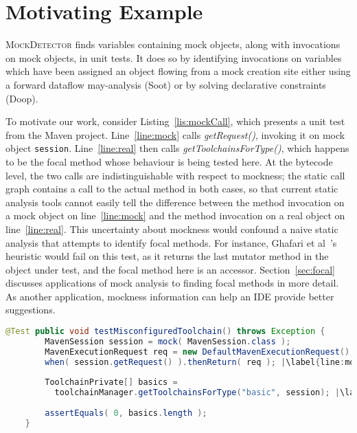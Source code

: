 \section{Motivating Example}
\label{sec:motivating-example}

\textsc{MockDetector} finds variables containing mock objects, along with invocations on mock objects, in unit tests. It does so by identifying invocations on variables which have been assigned an object flowing from a mock creation site either using a forward dataflow may-analysis (Soot) or by solving declarative constraints (Doop).

To motivate our work, consider Listing~\ref{lis:mockCall}, which presents a unit test from the Maven project. Line~\ref{line:mock} calls \textit{getRequest()}, invoking it on mock object \texttt{session}. Line~\ref{line:real} then calls \textit{getToolchainsForType()}, which happens to be the focal method whose behaviour is being tested here. At the bytecode level, the two calls are indistinguishable with respect to mockness; the static call graph contains a call to the actual method in both cases, so that current static analysis tools cannot easily tell the difference between the method invocation on a mock object on line~\ref{line:mock} and the method invocation on a real object on line~\ref{line:real}. This uncertainty about mockness would confound a naive static analysis that attempts to identify focal methods. For instance, Ghafari et al~\cite{ghafari15:_autom}'s heuristic would fail on this test, as it returns the last mutator method in the object under test, and the focal method here is an accessor. Section~\ref{sec:focal} discusses applications of mock analysis to finding focal methods in more detail. As another application, mockness information can help an IDE provide better suggestions. 

\begin{lstlisting}[basicstyle=\ttfamily, caption={This code snippet illustrates an example from maven-core, where calls to both the focal method \texttt{getToolchainsForType()} and to mock \texttt{session}'s \texttt{getRequest()} method occur in test \textit{testMisconfiguredToolchain()}.},
basicstyle=\scriptsize\ttfamily,language = Java, framesep=4.5mm, escapechar=|,
framexleftmargin=1.0mm, captionpos=b, label=lis:mockCall, morekeywords={@Test}]
	@Test public void testMisconfiguredToolchain() throws Exception {
	    MavenSession session = mock( MavenSession.class );
	    MavenExecutionRequest req = new DefaultMavenExecutionRequest();
	    when( session.getRequest() ).thenReturn( req ); |\label{line:mock}|
	    
	    ToolchainPrivate[] basics =
	      toolchainManager.getToolchainsForType("basic", session); |\label{line:real}|
	    
	    assertEquals( 0, basics.length );
	}
\end{lstlisting}

